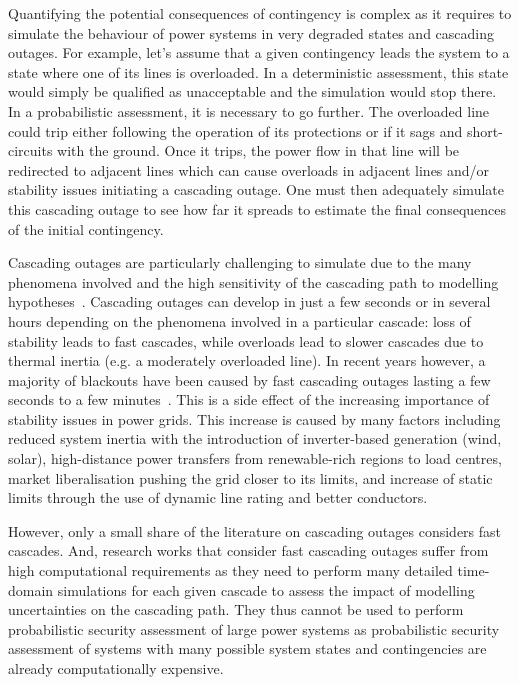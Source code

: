 Quantifying the potential consequences of contingency is complex as it requires to simulate the behaviour of power systems in very degraded states and cascading outages. For example, let's assume that a given contingency leads the system to a state where one of its lines is overloaded. In a deterministic assessment, this state would simply be qualified as unacceptable and the simulation would stop there. In a probabilistic assessment, it is necessary to go further. The overloaded line could trip either following the operation of its protections or if it sags and short-circuits with the ground. Once it trips, the power flow in that line will be redirected to adjacent lines which can cause overloads in adjacent lines and/or stability issues initiating a cascading outage. One must then adequately simulate this cascading outage to see how far it spreads to estimate the final consequences of the initial contingency.

Cascading outages are particularly challenging to simulate due to the many phenomena involved and the high sensitivity of the cascading path to modelling hypotheses~\cite{CascadingMethodoAndChallenges}. Cascading outages can develop in just a few seconds or in several hours depending on the phenomena involved in a particular cascade: loss of stability leads to fast cascades, while overloads lead to slower cascades due to thermal inertia (e.g. a moderately overloaded line). In recent years however, a majority of blackouts have been caused by fast cascading outages lasting a few seconds to a few minutes~\cite{cascadeAcceleration}. This is a side effect of the increasing importance of stability issues in power grids. This increase is caused by many factors including reduced system inertia with the introduction of inverter-based generation (wind, solar), high-distance power transfers from renewable-rich regions to load centres, market liberalisation pushing the grid closer to its limits, and increase of static limits through the use of dynamic line rating and better conductors.

However, only a small share of the literature on cascading outages considers fast cascades. And, research works that consider fast cascading outages suffer from high computational requirements as they need to perform many detailed time-domain simulations for each given cascade to assess the impact of modelling uncertainties on the cascading path. They thus cannot be used to perform probabilistic security assessment of large power systems as probabilistic security assessment of systems with many possible system states and contingencies are already computationally expensive.


